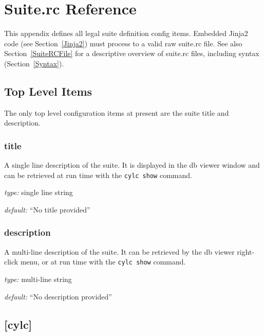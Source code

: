 \section{Suite.rc Reference}
\label{SuiteRCReference}

\lstset{language=bash}

This appendix defines all legal suite definition config items.
Embedded Jinja2 code (see Section~\ref{Jinja2}) must process to a valid
raw suite.rc file. See also Section~\ref{SuiteRCFile} for a descriptive
overview of suite.rc files, including syntax (Section~\ref{Syntax}).

\subsection{Top Level Items}

The only top level configuration items at present are the suite title
and description.

\subsubsection{title}

A single line description of the suite. It is displayed in the db viewer
window and can be retrieved at run time with the
\lstinline=cylc show= command.

\begin{myitemize}
\item {\em type:} single line string
\item {\em default:} ``No title provided''
\end{myitemize}

\subsubsection{description}

A multi-line description of the suite. It can be retrieved by the db viewer
right-click menu, or at run time with the \lstinline=cylc show= command.

\begin{myitemize}
\item {\em type:} multi-line string
\item {\em default:} ``No description provided''
\end{myitemize}

\subsection{[cylc]}

